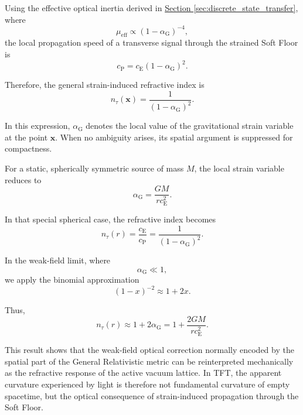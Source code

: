 Using the effective optical inertia derived in \hyperref[sec:discrete_state_transfer]{Section \ref*{sec:discrete_state_transfer}}, where
\begin{equation}
    \mu_{\mathrm{eff}} \propto (1-\alpha_{\mathrm{G}})^{-4},
\end{equation}
the local propagation speed of a transverse signal through the strained Soft Floor is
\begin{equation}
    c_{\mathrm{P}} = c_{\mathrm{E}} (1-\alpha_{\mathrm{G}})^2.
\end{equation}

Therefore, the general strain-induced refractive index is
\begin{equation}
    n_\tau(\mathbf{x}) = \frac{1}{(1-\alpha_{\mathrm{G}})^2}.
\end{equation}

In this expression, $\alpha_{\mathrm{G}}$ denotes the local value of the gravitational strain variable at the point $\mathbf{x}$. When no ambiguity arises, its spatial argument is suppressed for compactness.

For a static, spherically symmetric source of mass $M$, the local strain variable reduces to
\begin{equation}
    \alpha_{\mathrm{G}} = \frac{GM}{rc_{\mathrm{E}}^2}.
\end{equation}

In that special spherical case, the refractive index becomes
\begin{equation}
    n_\tau(r) = \frac{c_{\mathrm{E}}}{c_{\mathrm{P}}} = \frac{1}{(1-\alpha_{\mathrm{G}})^2}.
\end{equation}

In the weak-field limit, where
\begin{equation}
    \alpha_{\mathrm{G}} \ll 1,
\end{equation}
we apply the binomial approximation
\begin{equation}
    (1-x)^{-2} \approx 1+2x.
\end{equation}

Thus,
\begin{equation}
    n_\tau(r) \approx 1+2\alpha_{\mathrm{G}} = 1+\frac{2GM}{rc_{\mathrm{E}}^2}.
\end{equation}

This result shows that the weak-field optical correction normally encoded by the spatial part of the General Relativistic metric can be reinterpreted mechanically as the refractive response of the active vacuum lattice. In TFT, the apparent curvature experienced by light is therefore not fundamental curvature of empty spacetime, but the optical consequence of strain-induced propagation through the Soft Floor.

